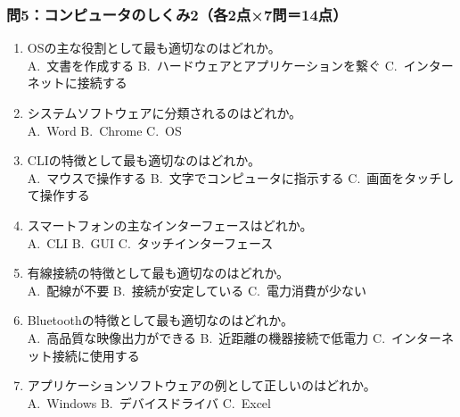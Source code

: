 \documentclass[a4paper,6pt,twoside]{jsarticle}
\begin{document}
\subsubsection*{問5：コンピュータのしくみ2（各2点×7問＝14点）}
\begin{enumerate}
\item OSの主な役割として最も適切なのはどれか。\\
A.~文書を作成する \quad B.~ハードウェアとアプリケーションを繋ぐ \quad C.~インターネットに接続する

\item システムソフトウェアに分類されるのはどれか。\\
A.~Word \quad B.~Chrome \quad C.~OS

\item CLIの特徴として最も適切なのはどれか。\\
A.~マウスで操作する \quad B.~文字でコンピュータに指示する \quad C.~画面をタッチして操作する

\item スマートフォンの主なインターフェースはどれか。\\
A.~CLI \quad B.~GUI \quad C.~タッチインターフェース

\item 有線接続の特徴として最も適切なのはどれか。\\
A.~配線が不要 \quad B.~接続が安定している \quad C.~電力消費が少ない

\item Bluetoothの特徴として最も適切なのはどれか。\\
A.~高品質な映像出力ができる \quad B.~近距離の機器接続で低電力 \quad C.~インターネット接続に使用する

\item アプリケーションソフトウェアの例として正しいのはどれか。\\
A.~Windows \quad B.~デバイスドライバ \quad C.~Excel
\end{enumerate}

\vspace{-3mm}
\end{document}
